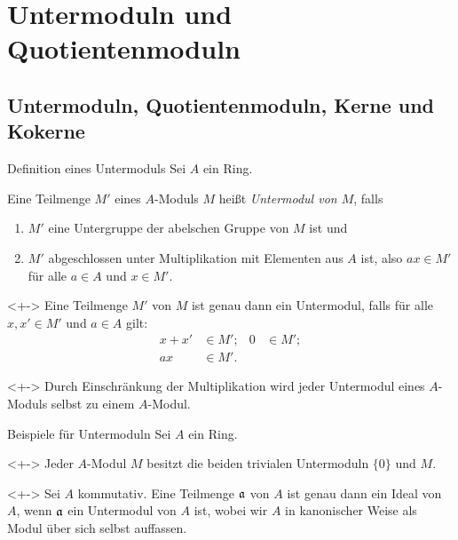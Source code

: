 \section{Untermoduln und Quotientenmoduln}

\subsection{Untermoduln, Quotientenmoduln, Kerne und Kokerne}

\begin{frame}{Definition eines Untermoduls}
	Sei \(A\) ein Ring.
	\begin{definition}
		Eine Teilmenge \(M'\) eines \(A\)-Moduls \(M\) heißt \emph{Untermodul von
		\(M\)}, falls
		\begin{enumerate}[<+->]
			\item \(M'\) eine Untergruppe der abelschen Gruppe von \(M\) ist und
			\item \(M'\) abgeschlossen unter Multiplikation mit Elementen aus \(A\) ist,
			also \(a x \in M'\) für alle \(a \in A\) und \(x \in M'\).
		\end{enumerate}
	\end{definition}
	\begin{visibleenv}<+->
		Eine Teilmenge \(M'\) von \(M\) ist genau dann ein Untermodul, falls für alle
		\(x, x' \in M'\) und \(a \in A\) gilt:
		\begin{align*}
			x + x' & \in M'; & 0 & \in M'; \\
			a x & \in M'.
		\end{align*}
	\end{visibleenv}
	\begin{remark}<+->
		Durch Einschränkung der Multiplikation wird jeder Untermodul eines \(A\)-Moduls
		selbst zu einem \(A\)-Modul.
	\end{remark}
\end{frame}

\begin{frame}{Beispiele für Untermoduln}
	Sei \(A\) ein Ring.
	\begin{example}<+->
		Jeder \(A\)-Modul \(M\) besitzt die beiden trivialen Untermoduln \(\{0\}\) und
		\(M\).
	\end{example}
	\begin{example}<+->
		Sei \(A\) kommutativ. Eine Teilmenge \(\mathfrak{a}\) von \(A\) ist genau dann
		ein Ideal von \(A\), wenn \(\mathfrak{a}\) ein Untermodul von \(A\) ist,
		wobei wir \(A\) in kanonischer Weise als Modul über sich selbst auffassen.
	\end{example}
\end{frame}

